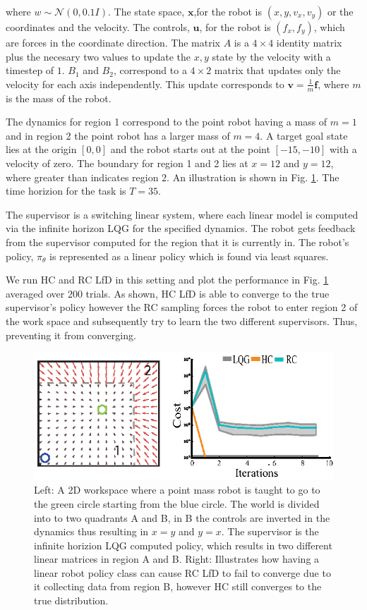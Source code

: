 \documentclass[10pt, conference]{ieeeconf}      %
\newcommand{\bu}{\mathbf{u}}
\newcommand{\bx}{\mathbf{x}}
\begin{document}
where $w\sim \mathcal{N}(0,0.1 I)$. The state space, $\bx$,for the robot is $(x,y,v_x,v_y)$ or the coordinates and the velocity. The controls, $\bu$, for the robot is $(f_x,f_y)$, which are forces in the coordinate direction. The matrix $A$ is a $4\times4$ identity matrix plus the necesary two values to update the $x,y$ state by the velocity with a timestep of $1$. $B_1$ and $B_2$, correspond to a $4\times 2$ matrix that updates only the velocity for each axis independently. This update corresponds to $\mathbf{v} = \frac{1}{m} \mathbf{f}$, where $m$ is the mass of the robot. 


 The dynamics for region 1 correspond to the point robot having a mass of $m=1$ and in region 2 the point robot has a larger mass of $m=4$. A target goal state lies at the origin $[0,0]$ and the robot starts out at the point $[-15,-10]$ with a velocity of zero. The boundary for region 1 and 2 lies at $x=12$ and $y=12$, where greater than indicates region 2. An illustration is shown in Fig. \ref{fig:p_mass}. The time horizion for the task is $T=35$. 

The supervisor is a switching linear system, where each linear model is computed via the infinite horizon LQG for the specified dynamics. The robot gets feedback from the supervisor computed for the region that it is currently in.  The robot's policy, $\pi_{\theta}$ is represented as a linear policy which is found via least squares. 

We run HC and RC LfD in this setting and plot the performance in Fig. \ref{fig:p_mass} averaged over $200$ trials.  As shown, HC LfD is able to converge to the true supervisor's policy however the RC sampling  forces the robot to enter region 2 of the work space and subsequently try to learn the two different supervisors. Thus, preventing it from converging. 

\begin{figure}
\centering
\includegraphics{f_figs/p_mass.eps}
\caption{
    \footnotesize
Left: A 2D workspace where a point mass robot is taught to go to the green circle starting from the blue circle. The world is divided into to two quadrants A and B, in B the controls are inverted in the dynamics thus resulting in $x=y$ and $y=x$. The supervisor is the infinite horizion LQG computed policy, which results in two different linear matrices in region A and B. Right: Illustrates how having a linear robot policy class can cause RC LfD to fail  to converge due to it collecting data from region B, however HC still converges to the true distribution. }
\vspace*{-1pt}
\label{fig:p_mass}
\end{figure}
\end{document}
